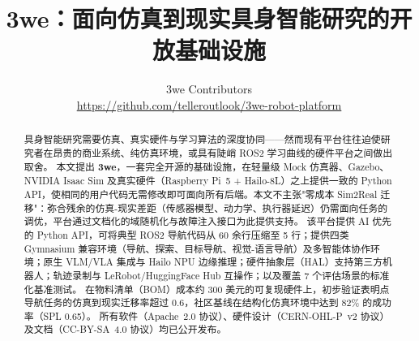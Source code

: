\documentclass[UTF8]{ctexart}
\begin{document}
\title{\textbf{3we：面向仿真到现实具身智能研究的开放基础设施}}

\author{3we Contributors\\
\small \url{https://github.com/telleroutlook/3we-robot-platform}}

\date{}

\maketitle

\begin{abstract}
具身智能研究需要仿真、真实硬件与学习算法的深度协同——然而现有平台往往迫使研究者在昂贵的商业系统、纯仿真环境，或具有陡峭 ROS2 学习曲线的硬件平台之间做出取舍。
本文提出 \textbf{3we}，一套完全开源的基础设施，在轻量级 Mock 仿真器、Gazebo、NVIDIA Isaac Sim 及真实硬件（Raspberry Pi~5 + Hailo-8L）之上提供一致的 Python API，使相同的用户代码无需修改即可面向所有后端。本文不主张"零成本 Sim2Real 迁移"：弥合残余的仿真-现实差距（传感器模型、动力学、执行器延迟）仍需面向任务的调优，平台通过文档化的域随机化与故障注入接口为此提供支持。
该平台提供 AI 优先的 Python API，可将典型 ROS2 导航代码从 60 余行压缩至 5 行；提供四类 Gymnasium 兼容环境（导航、探索、目标导航、视觉-语言导航）及多智能体协作环境；原生 VLM/VLA 集成与 Hailo NPU 边缘推理；硬件抽象层（HAL）支持第三方机器人；轨迹录制与 LeRobot/HuggingFace Hub 互操作；以及覆盖 7 个评估场景的标准化基准测试。
在物料清单（BOM）成本约 300 美元的可复现硬件上，初步验证表明点导航任务的仿真到现实迁移率超过 0.6，社区基线在结构化仿真环境中达到 82\% 的成功率（SPL 0.65）。
所有软件（Apache~2.0 协议）、硬件设计（CERN-OHL-P~v2 协议）及文档（CC-BY-SA~4.0 协议）均已公开发布。
\end{abstract}
\end{document}
